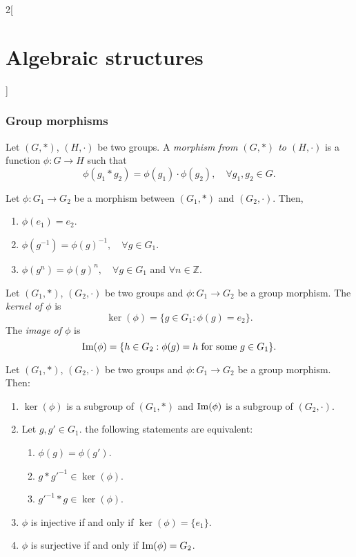 \documentclass[class=article,10pt,crop=false]{standalone}
\begin{document}
\begin{multicols}{2}[\section{Algebraic structures}]
\subsubsection*{Group morphisms}
\begin{definition}
Let $(G,*)$, $(H,\cdot)$ be two groups. A \textit{morphism from $(G,*)$ to $(H,\cdot)$} is a function $\phi:G\rightarrow H$ such that $$\phi(g_1*g_2)=\phi(g_1)\cdot\phi(g_2),\quad\forall g_1,g_2\in G.$$
\end{definition}
\begin{lemma}
Let $\phi:G_1\rightarrow G_2$ be a morphism between $(G_1,*)$ and $(G_2,\cdot)$. Then,
\begin{enumerate}
    \item $\phi(e_1)=e_2$.
    \item $\phi(g^{-1})=\phi(g)^{-1},\quad\forall g\in G_1$.
    \item $\phi(g^n)=\phi(g)^n,\quad\forall g\in G_1$ and $\forall n\in\mathbb{Z}$.
\end{enumerate}
\end{lemma}
\begin{definition}
Let $(G_1,*)$, $(G_2,\cdot)$ be two groups and $\phi:G_1\rightarrow G_2$ be a group morphism. The \textit{kernel of $\phi$} is $$\ker(\phi)=\{g\in G_1:\phi(g)=e_2\}.$$ The \textit{image of $\phi$} is $$\operatorname{Im}(\phi)=\{h\in G_2:\phi(g)=h\text{ for some }g\in G_1\}.$$
\end{definition}
\begin{prop}
Let $(G_1,*)$, $(G_2,\cdot)$ be two groups and $\phi:G_1\rightarrow G_2$ be a group morphism. Then:
\begin{enumerate}
    \item $\ker(\phi)$ is a subgroup of $(G_1,*)$ and $\operatorname{Im}(\phi)$ is a subgroup of $(G_2,\cdot)$.
    \item Let $g,g'\in G_1$. the following statements are equivalent:
    \begin{enumerate}
        \item $\phi(g)=\phi(g')$.
        \item $g*g'^{-1}\in\ker(\phi)$.
        \item $g'^{-1}*g\in\ker(\phi)$.
    \end{enumerate}
    \item $\phi$ is injective if and only if $\ker(\phi)=\{e_1\}$.
    \item $\phi$ is surjective if and only if $\operatorname{Im}(\phi)=G_2$.
\end{enumerate}
\end{prop}

\end{multicols}
\end{document}
